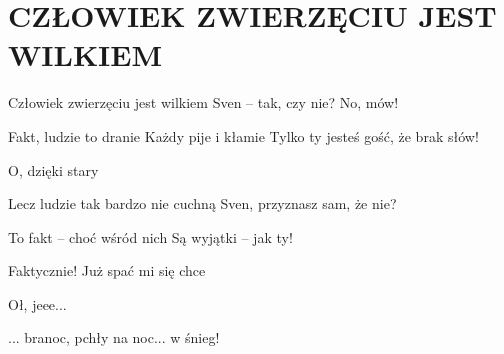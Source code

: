 \documentclass[../../../songbook.tex]{subfiles}
\begin{document}
\TabPositions{8cm} %
\section*{CZŁOWIEK ZWIERZĘCIU JEST WILKIEM}
{}
\vspace{0.5cm}
Człowiek zwierzęciu jest wilkiem		 \newline
Sven – tak, czy nie? No, mów!		 \newline

Fakt, ludzie to dranie				 \newline
Każdy pije i kłamie				 \newline
Tylko ty jesteś gość, że brak słów!	 \newline

O, dzięki stary					 \newline

Lecz ludzie tak bardzo nie cuchną	 \newline
Sven, przyznasz sam, że nie?			 \newline
	
To fakt – choć wśród nich				 \newline
Są wyjątki – jak ty!					 \newline

Faktycznie! Już spać mi się chce		 \newline

Oł, jeee...								 \newline

... branoc, pchły na noc... w śnieg!	  \newline
\end{document}
